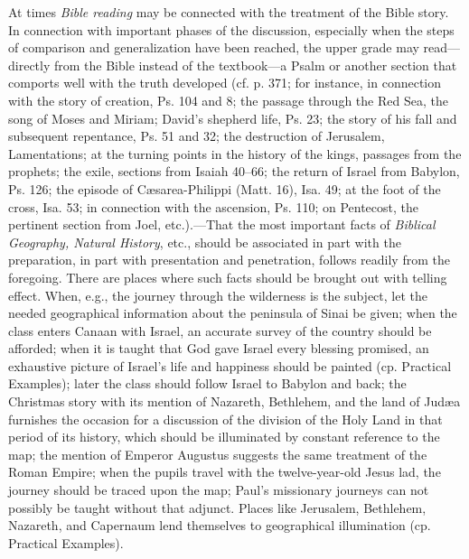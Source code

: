 At times \emph{Bible reading} may be connected with the treatment of the Bible story. In connection with important phases of the discussion, especially when the steps of comparison and generalization have been reached, the upper grade may read—directly from the Bible instead of the textbook—a Psalm or another section that comports well with the truth developed (cf. p. 371; for instance, in connection with the story of creation, Ps. 104 and 8; the passage through the Red Sea, the song of Moses and Miriam; David’s shepherd life, Ps. 23; the story of his fall and subsequent repentance, Ps. 51 and 32; the destruction of Jerusalem, Lamentations; at the turning points in the history of the kings, passages from the prophets; the exile, sections from Isaiah 40–66; the return of Israel from Babylon, Ps. 126; the episode of Cæsarea-Philippi (Matt. 16), Isa. 49; at the foot of the cross, Isa. 53; in connection with the ascension, Ps. 110; on Pentecost, the pertinent section from Joel, etc.).—That the most important facts of \emph{\emph{Biblical Geography, Natural History}}, etc., should be associated in part with the preparation, in part with presentation and penetration, follows readily from the foregoing. There are places where such facts should be brought out with telling effect. When, e.g., the journey through the wilderness is the subject, let the needed geographical information about the peninsula of Sinai be given; when the class enters Canaan with Israel, an accurate survey of the
country should be afforded; when it is taught that God gave Israel every blessing promised, an exhaustive picture of Israel’s life and happiness should be painted (cp. Practical Examples); later the class should follow Israel to Babylon and back; the Christmas story with its mention of Nazareth, Bethlehem, and the land of Judæa furnishes the occasion for a discussion of the division of the Holy Land in that period of its history, which should be illuminated by constant reference to the map; the mention of Emperor Augustus suggests the same treatment of the Roman Empire; when the pupils travel with the twelve-year-old Jesus lad, the journey should be traced upon the map; Paul’s missionary journeys can not possibly be taught without that adjunct. Places like Jerusalem, Bethlehem, Nazareth, and Capernaum lend themselves to geographical illumination (cp. Practical Examples).

